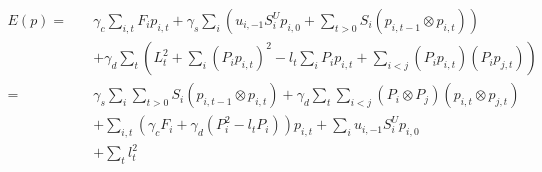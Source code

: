 \begin{subequations}
\begin{align}
  E(p) = \quad
  &
  \gamma_c \sum_{i, t} F_i p_{i, t}
  + \gamma_s \sum_i \left(
      u_{i, -1} S_i^U p_{i, 0}
      + \sum_{t > 0} S_i \left( p_{i, t-1} \otimes p_{i, t} \right)
    \right)
  \\ &
  + \gamma_d \sum_t \left(
    L_t^2
    + \sum_i \left( P_i p_{i, t} \right)^2 - l_t \sum_i P_i p_{i, t}
    + \sum_{i < j} \left( P_i p_{i, t} \right) \left( P_i p_{j, t} \right)
  \right) \\
  = \quad
  &
  \gamma_s \sum_i \sum_{t > 0} S_i \left( p_{i, t-1} \otimes p_{i, t} \right)
  + \gamma_d \sum_t \sum_{i < j} \left( P_i \otimes P_j \right) \left( p_{i, t} \otimes p_{j, t} \right)
  \\ &
  + \sum_{i, t} \left(
    \gamma_c F_i + \gamma_d \left(P_i^2 - l_t P_i \right)
  \right) p_{i, t}
  + \sum_i u_{i, -1} S_i^U p_{i, 0}
  \\ &
  + \sum_t l_t^2
\end{align}
\end{subequations}

